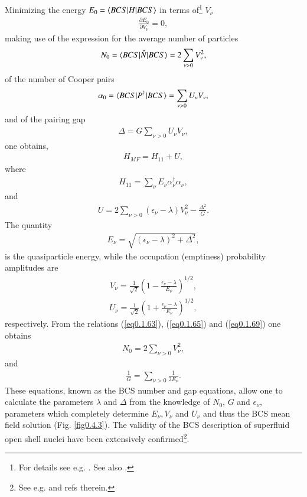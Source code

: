 Minimizing the energy $E_0=\langle {BCS|H|BCS} \rangle$ in terms of\footnote{For details see e.g. \cite{Ragnarsson:05}. See also \cite{Nathan:65}.} $V_\nu$
\begin{align}\label{eq0.1.62}
\frac{\partial E_0}{\partial V_\nu}=0,
\end{align}
 making use of the expression for the average number of particles
\begin{align}\label{eq0.1.63}
N_0=\langle {BCS|\hat N|BCS} \rangle=2\sum_{\nu>0}V_\nu^2,
\end{align}
 of the number of Cooper pairs
\begin{align}\label{eq0.1.64}
\alpha_0=\langle {BCS|P^\dagger|BCS} \rangle=\sum_{\nu>0}U_\nu V_\nu,
\end{align}
and of the pairing gap
\begin{align}\label{eq0.1.65}
\Delta=G\sum_{\nu>0}U_\nu V_{\nu},
\end{align}
one obtains,
\begin{align}\label{eq0.1.66}
H_{MF}=H_{11}+U,
\end{align}
where 
\begin{align}\label{eq0.1.67}
H_{11}=\sum_\nu E_\nu \alpha^\dagger_\nu\alpha_\nu,
\end{align}
and
\begin{align}\label{eq0.1.68}
U=2\sum_{\nu>0}(\epsilon_\nu-\lambda)V^2_\nu-\frac{\Delta^2}{G}.
\end{align}
The quantity
\begin{align}\label{eq0.1.69}
E_\nu=\sqrt{(\epsilon_\nu-\lambda)^2+\Delta^2},
\end{align}
is the quasiparticle energy, while the occupation (emptiness) probability amplitudes are
\begin{align}\label{eq0.1.70}
V_\nu=\frac{1}{\sqrt{2}}\left(1-\frac{\epsilon_\nu-\lambda}{E_\nu}\right)^{1/2},
\end{align}
\begin{align}\label{eq0.1.71}
U_\nu=\frac{1}{\sqrt{2}}\left(1+\frac{\epsilon_\nu-\lambda}{E_\nu}\right)^{1/2},
\end{align}
 respectively. From the relations (\ref{eq0.1.63}),  (\ref{eq0.1.65}) and (\ref{eq0.1.69}) one obtains
\begin{align}\label{eq0.1.72}
N_0=2\sum_{\nu>0}V^2_\nu,
\end{align}
 and 
\begin{align}\label{eq0.1.73}
\frac{1}{G}=\sum_{\nu>0}\frac{1}{2E_\nu}.
\end{align}
These equations, known as the BCS number and gap equations, allow one to calculate the parameters $\lambda$ and $\Delta$ from the knowledge of $N_0$, $G$ and $\epsilon_\nu$, parameters which completely determine $E_\nu,V_\nu$ and $U_\nu$ and thus the BCS mean field solution (Fig. \ref{fig0.4.3}). The validity of the BCS description of superfluid open shell nuclei have been extensively confirmed\footnote{See e.g. \cite{Broglia:13} and refs therein.}. 

